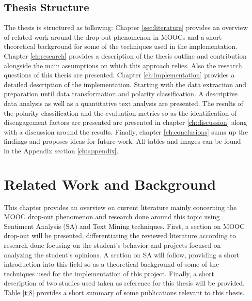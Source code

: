 \documentclass[
	a4paper,
	pdftex,
	12pt,	
	footinclude=true,
	fleqn,
	final,
	]{report}%
\begin{document}
\vspace{-0.45cm}
\section{Thesis Structure}
\vspace{-0.3cm}

The thesis is structured as following: Chapter \ref{sec:literature} 
provides an overview of related work around the drop-out phenomenon in MOOCs 
and a short theoretical background for some of the techniques
used in the implementation. Chapter \ref{ch:research} provides a description of 
the thesis outline and contribution alongside the main assumptions 
on which this approach relies. Also the research questions of this thesis
are presented. Chapter \ref{ch:implementation} provides a detailed description 
of the implementation. Starting with the data extraction and preparation until
data transformation and polarity classification. 
A descriptive data analysis as well as 
a quantitative text analysis are presented. 
The results of the polarity classification and the evaluation metrics so as 
the identification of disengagement factors are presented are presented in chapter \ref{ch:discussion}
along with a discussion around the results. 
Finally, chapter \ref{ch:conclusions} sums up the findings and proposes 
ideas for future work. All tables and images can be found in the Appendix section \ref{ch:appendix}.

\chapter{Related Work and Background} %
\vspace{-0.6cm}
\label{sec:literature}
This chapter provides an overview on current literature mainly concerning the MOOC drop-out phenomenon
and research done around this topic using Sentiment Analysis (SA) and Text Mining techniques. 
First, a section on MOOC drop-out will be presented, differentiating the 
reviewed literature according to research done focusing on the student's behavior and 
projects focused on analyzing the student's opinions.
A section on SA will follow, providing a short introduction into this field 
so as a theoretical background of some of the techniques used for the implementation of this project. Finally, a 
short description of two studies used taken as reference
for this thesis will be provided. Table \ref{t:8} provides a short summary of some
publications relevant to this thesis.
\end{document}
